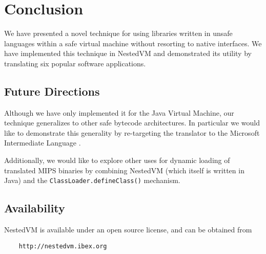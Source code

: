 \documentclass{acmconf}
\begin{document}
\section{Conclusion}

We have presented a novel technique for using libraries written in
unsafe languages within a safe virtual machine without resorting to
native interfaces.  We have implemented this technique in NestedVM and
demonstrated its utility by translating six popular software
applications.

\subsection{Future Directions}

Although we have only implemented it for the Java Virtual Machine, our
technique generalizes to other safe bytecode architectures.  In
particular we would like to demonstrate this generality by re-targeting
the translator to the Microsoft Intermediate Language \cite{msil}.

Additionally, we would like to explore other uses for dynamic loading
of translated MIPS binaries by combining NestedVM (which itself is
written in Java) and the {\tt ClassLoader.defineClass()} mechanism.

\subsection{Availability}

NestedVM is available under an open source license, and can be
obtained from
\begin{verbatim}
    http://nestedvm.ibex.org
\end{verbatim}



\end{document}

